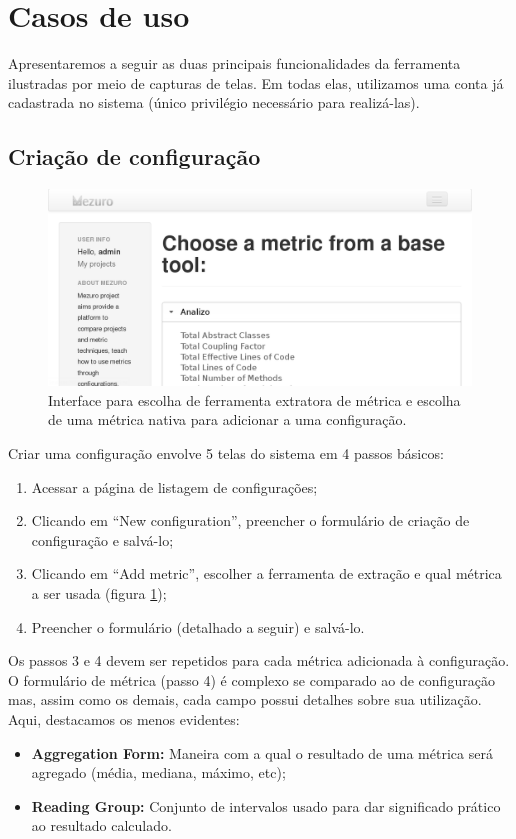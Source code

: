 \documentclass{llncs}
\begin{document}
\section{Casos de uso}
Apresentaremos a seguir as duas principais funcionalidades da ferramenta ilustradas por meio de capturas de telas. Em todas elas, utilizamos uma conta já cadastrada no sistema (único privilégio necessário para realizá-las).

  \subsection{Criação de configuração}
  \begin{figure}[H]
    \centering
    \includegraphics[width=\textwidth]{images/choose-metric.png}
    \caption{Interface para escolha de ferramenta extratora de métrica e escolha de uma métrica nativa para adicionar a uma configuração.}
    \label{fig:choose-metric}
  \end{figure}

  Criar uma configuração envolve 5 telas do sistema em 4 passos básicos:
  \begin{enumerate}
    \item Acessar a página de listagem de configurações;
    \item Clicando em ``New configuration'', preencher o formulário de criação de configuração e salvá-lo;
    \item Clicando em ``Add metric'', escolher a ferramenta de extração e qual métrica a ser usada (figura \ref{fig:choose-metric});
    \item Preencher o formulário (detalhado a seguir) e salvá-lo.
  \end{enumerate}

  Os passos 3 e 4 devem ser repetidos para cada métrica adicionada à configuração. O formulário de métrica (passo 4) é complexo se comparado ao de configuração mas, assim como os demais, cada campo possui detalhes sobre sua utilização. Aqui, destacamos os menos evidentes:
  \begin{itemize}
    \item \textbf{Aggregation Form:} Maneira com a qual o resultado de uma métrica será agregado (média, mediana, máximo, etc);
    \item \textbf{Reading Group:} Conjunto de intervalos usado para dar significado prático ao resultado calculado.
  \end{itemize}
\end{document}
